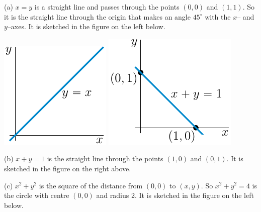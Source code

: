 \begin{solution}
(a) $x=y$ is a straight line and passes through the points $(0,0)$
and $(1,1)$. So it is the straight line through the origin that makes an angle $45^\circ$ with the $x$-- and $y$--axes. It is sketched in the figure on the 
left below.

\begin{center}
     \includegraphics{fig/sec1_1_Q1a.pdf}\qquad\qquad
     \includegraphics{fig/sec1_1_Q1b.pdf}
\end{center}

(b) $x+y=1$ is the straight line through the points $(1,0)$ and
$(0,1)$. It is sketched in the figure on the right above.

(c) $x^2+y^2$ is the square of the distance from $(0,0)$ to $(x,y)$.
So $x^2+y^2=4$ is the circle with centre $(0,0)$ and radius 2.
It is sketched in the figure on the left below.


\end{solution}
